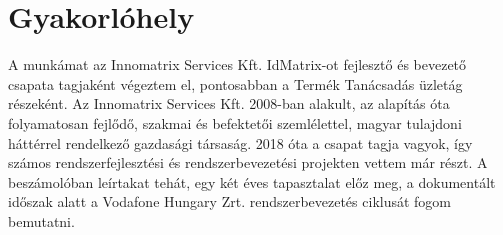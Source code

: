 
\chapter{Gyakorlóhely}

A munkámat az Innomatrix Services Kft. \cite{inno} IdMatrix-ot fejlesztő és bevezető csapata tagjaként végeztem el, pontosabban a Termék Tanácsadás üzletág részeként. Az Innomatrix Services Kft. 2008-ban alakult, az alapítás óta folyamatosan fejlődő, szakmai és befektetői szemlélettel, magyar tulajdoni háttérrel rendelkező gazdasági társaság. 2018 óta a csapat tagja vagyok, így számos rendszerfejlesztési és rendszerbevezetési projekten vettem már részt. A beszámolóban leírtakat tehát, egy két éves tapasztalat előz meg, a dokumentált időszak alatt a Vodafone Hungary Zrt. rendszerbevezetés ciklusát fogom bemutatni.










